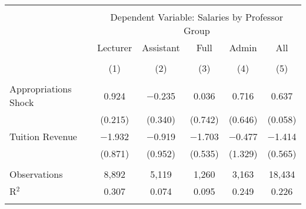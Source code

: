 
\begin{tabular}{@{\extracolsep{5pt}}lccccc} 
\\[-1.8ex]\hline 
\hline \\[-1.8ex] 
 & \multicolumn{5}{c}{Dependent Variable: Salaries by Professor Group} \\ 
\cline{2-6} 
 & Lecturer & Assistant & Full & Admin & All \\ 
\\[-1.8ex] & (1) & (2) & (3) & (4) & (5)\\ 
\hline \\[-1.8ex] 
 Appropriations Shock & 0.924 & $-$0.235 & 0.036 & 0.716 & 0.637 \\ 
  & (0.215) & (0.340) & (0.742) & (0.646) & (0.058) \\ 
  Tuition Revenue & $-$1.932 & $-$0.919 & $-$1.703 & $-$0.477 & $-$1.414 \\ 
  & (0.871) & (0.952) & (0.535) & (1.329) & (0.565) \\ 
 \hline \\[-1.8ex] 
Observations & 8,892 & 5,119 & 1,260 & 3,163 & 18,434 \\ 
R$^{2}$ & 0.307 & 0.074 & 0.095 & 0.249 & 0.226 \\ 
\hline 
\hline \\[-1.8ex] 
\end{tabular} 
